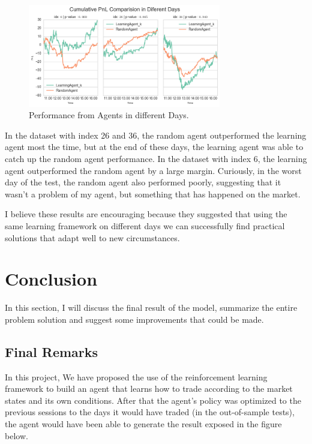 \documentclass[a4paper]{article}
\begin{document}
\begin{figure}[ht]
\centering
\includegraphics[width=0.75\textwidth]{figures/pnl_diff_days_compare.png}
\caption{\label{fig:pnl_diff_days_compare}Performance from Agents in different Days.}
\end{figure}

In the dataset with index 26 and 36, the random agent outperformed the learning agent most the time, but at the end of these days, the learning agent was able to catch up the random agent performance. In the dataset with index 6, the learning agent outperformed the random agent by a large margin. Curiously, in the worst day of the test, the random agent also performed poorly, suggesting that it wasn't a problem of my agent, but something that has happened on the market.

I believe these results are encouraging because they suggested that using the same learning framework on different days we can successfully find practical solutions that adapt well to new circumstances.


\section{Conclusion}
\label{sec:conclusion}

In this section, I will discuss the final result of the model, summarize the entire problem solution and suggest some improvements that could be made.

\subsection{Final Remarks}

In this project, We have proposed the use of the reinforcement learning framework to build an agent that learns how to trade according to the market states and its own conditions. After that the agent's policy was optimized to the previous sessions to the days it would have traded (in the out-of-sample tests), the agent would have been able to generate the result exposed in the figure below.
\end{document}
